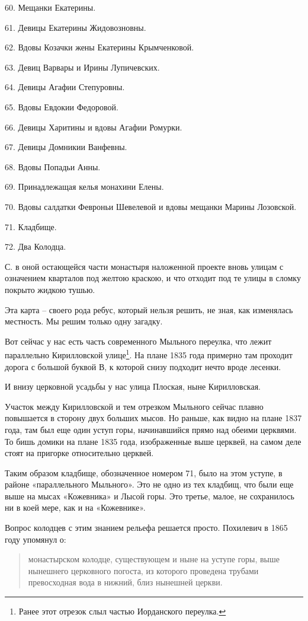60. Мещанки Екатерины.

61. Девицы Екатерины Жидовозновны.

62. Вдовы Козачки жены Екатерины Крымченковой.

63. Девиц Варвары и Ирины Лупичевских.

64. Девицы Агафии Степуровны.

65. Вдовы Евдокии Федоровой.

66. Девицы Харитины и вдовы Агафии Ромурки.

67. Девицы Домникии Ванфевны.

68. Вдовы Попадьи Анны.

69. Принадлежащая келья монахини Елены.

70. Вдовы салдатки Февроньи Шевелевой и вдовы мещанки Марины Лозовской.

71. Кладбище.

72. Два Колодца.

С. в оной остающейся части монастыря наложенной проекте вновь улицам с означением кварталов под желтою краскою, и что отходит под те улицы в сломку покрыто жидкою тушью.

Эта карта – своего рода ребус, который нельзя решить, не зная, как изменялась местность. Мы решим только одну загадку.

Вот сейчас у нас есть часть современного Мыльного переулка, что лежит параллельно Кирилловской улице\footnote{Ранее этот отрезок слыл частью Иорданского переулка.}. На плане 1835 года примерно там проходит дорога с большой буквой В, к которой снизу подходит нечто вроде лесенки.

И внизу церковной усадьбы у нас улица Плоская, ныне Кирилловская.

Участок между Кирилловской и тем отрезком Мыльного сейчас плавно повышается в сторону двух больших мысов. Но раньше, как видно на плане 1837 года, там был еще один уступ горы, начинавшийся прямо над обеими церквями. То бишь домики на плане 1835 года, изображенные выше церквей, на самом деле стоят на пригорке относительно церквей.

Таким образом кладбище, обозначенное номером 71, было на этом уступе, в районе «параллельного Мыльного». Это не одно из тех кладбищ, что были еще выше на мысах «Кожевника» и Лысой горы. Это третье, малое, не сохранилось ни в коей мере, как и на «Кожевнике».

Вопрос колодцев с этим знанием рельефа решается просто. Похилевич в 1865 году упомянул о:

\begin{quotation}
монастырском колодце, существующем и ныне на уступе горы, выше нынешнего церковного погоста, из которого проведена трубами превосходная вода в нижний, близ нынешней церкви.
\end{quotation}

